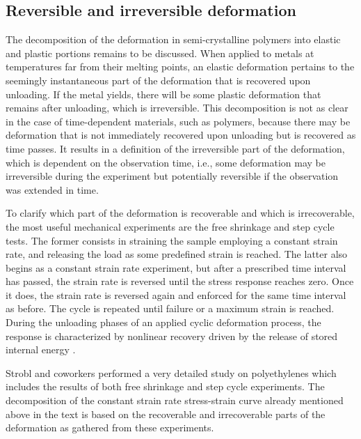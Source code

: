 \subsection{Reversible and irreversible deformation}
\label{sec:reversible_and_irreversible_deformation}

The decomposition of the deformation in semi-crystalline polymers into elastic and plastic portions remains to be discussed.
When applied to metals at temperatures far from their melting points, an elastic deformation pertains to the seemingly instantaneous part of the deformation that is recovered upon unloading.
If the metal yields, there will be some plastic deformation that remains after unloading, which is irreversible.
This decomposition is not as clear in the case of time-dependent materials, such as polymers, because there may be deformation that is not immediately recovered upon unloading but is recovered as time passes.
It results in a definition of the irreversible part of the deformation, which is dependent on the observation time, i.e., some deformation may be irreversible during the experiment but potentially reversible if the observation was extended in time.

To clarify which part of the deformation is recoverable and which is irrecoverable, the most useful mechanical experiments are the free shrinkage and step cycle tests.
The former consists in straining the sample employing a constant strain rate, and releasing the load as some predefined strain is reached.
The latter also begins as a constant strain rate experiment, but after a prescribed time interval has passed, the strain rate is reversed until the stress response reaches zero.
Once it does, the strain rate is reversed again and enforced for the same time interval as before.
The cycle is repeated until failure or a maximum strain is reached.
During the unloading phases of an applied cyclic deformation process, the response is characterized by nonlinear recovery driven by the release of stored internal energy \citep{bergstromConstitutiveModelingUltrahigh2002}.

Strobl and coworkers \citep{hissNetworkStretchingSlip1999, hobeikaTemperatureStrainRate2000, hongModelTreatingTensile2004, hongModelTreatmentTensile2004, naViscousForceDominatedTensileDeformation2006} performed a very detailed study on polyethylenes which includes the results of both free shrinkage and step cycle experiments.
The decomposition of the constant strain rate stress-strain curve already mentioned above in the text is based on the recoverable and irrecoverable parts of the deformation as gathered from these experiments.

